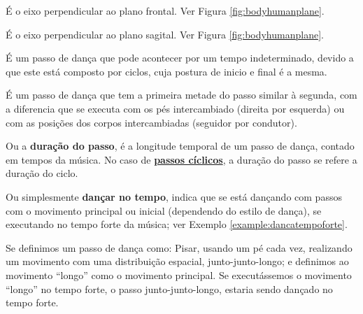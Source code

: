 \begin{definition} 
\label{def:EixoFrontal}
É o eixo perpendicular ao plano frontal.
Ver Figura \ref{fig:bodyhumanplane}.
\end{definition}

\begin{definition} 
\label{def:EixoSagital}
É o eixo perpendicular ao plano sagital.
Ver Figura \ref{fig:bodyhumanplane}.
\end{definition}

\begin{definition} 
\label{def:PassoCiclico}
É um passo de dança que pode acontecer por um tempo indeterminado,
devido a que este está composto por ciclos, cuja postura de inicio e final é a mesma.
\end{definition}

\begin{definition} 
\label{def:PassoSimetrico}
É um passo de dança que tem a primeira metade do passo similar à segunda,
com a diferencia que se executa com os pés intercambiado (direita por esquerda)
ou com as posições dos corpos intercambiadas (seguidor por condutor).
\end{definition}

\begin{definition} 
\label{def:DuracaoDoPasso}
Ou a \textbf{duração do passo}, 
é a longitude temporal de um passo de dança, contado em tempos da música.
No caso de \hyperref[def:PassoCiclico]{\textbf{passos cíclicos}}, a duração do passo se refere a duração do ciclo.
\end{definition}


\begin{definition} 
\label{def:DancaNoTempo}
Ou simplesmente \textbf{dançar no tempo}, indica que se está dançando com passos com o movimento principal ou inicial (dependendo do estilo de dança), 
se executando no tempo forte da música; ver Exemplo \ref{example:dancatempoforte}.
\end{definition}
\begin{example}
\label{example:dancatempoforte}
Se definimos um passo de dança como: Pisar, usando um pé cada vez, 
realizando um movimento com uma distribuição espacial, junto-junto-longo;
e definimos ao movimento ``longo'' como o movimento principal. 
Se executássemos o movimento ``longo'' no tempo forte, o passo junto-junto-longo,
estaria sendo dançado no tempo forte.
\end{example}


